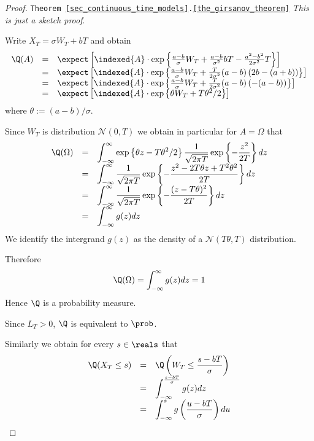\documentclass[11pt,a4paper]{article}
\begin{document}
  \begin{proof}{\texttt{Theorem \ref{sec_continuous_time_models}.\ref{the_girsanov_theorem}}}
    \textit{This is just a sketch proof}.
    \par Write $X_T=\sigma W_T+bT$ and obtain
    \[\begin{array}{rcl}
      \Q(A)&=&\expect\left[\indexed\{A\}\cdot\exp\left\{\frac{a-b}\sigma W_T+\frac{a-b}{\sigma^2}bT-\frac{a^2-b^2}{2\sigma^2}T\right\}\right]\\
      &=&\expect\left[\indexed\{A\}\cdot\exp\left\{\frac{a-b}\sigma W_T+\frac{T}{2\sigma^2}(a-b)\left(2b-(a+b)\right)\right\}\right]\\
      &=&\expect\left[\indexed\{A\}\cdot\exp\left\{\frac{a-b}\sigma W_T+\frac{T}{2\sigma^2}(a-b)\left(-(a-b)\right)\right\}\right]\\
      &=&\expect\left[\indexed\{A\}\cdot\exp\left\{\theta W_T+T\theta^2/2\right\}\right]
    \end{array}\]
    where $\theta:=(a-b)/\sigma$.
    \par Since $W_T$ is distribution $\mathcal{N}(0,T)$ we obtain in particular for $A=\Omega$ that
    \[\everymath={\displaystyle}\begin{array}{rcl}
      \Q(\Omega)&=&\int_{-\infty}^\infty\exp\left\{\theta z-T\theta^2/2\right\}\frac1{\sqrt{2\pi T}}\exp\left\{-\frac{z^2}{2T}\right\}dz\\
      &=&\int_{-\infty}^\infty\frac1{\sqrt{2\pi T}}\exp\left\{-\frac{z^2-2T\theta z+T^2\theta^2}{2T}\right\}dz\\
      &=&\int_{-\infty}^\infty\frac1{\sqrt{2\pi T}}\exp\left\{-\frac{(z-T\theta)^2}{2T}\right\}dz\\
      &=&\int_{-\infty}^\infty g(z)dz
    \end{array}\]
    We identify the intergrand $g(z)$ as the density of a $\mathcal{N}(T\theta,T)$ distribution.
    \par Therefore
    \[ \Q(\Omega)=\int_{-\infty}^\infty g(z)dz=1 \]
    Hence $\Q$ is a probability measure.
    \par Since $L_T>0$, $\Q$ is equivalent to $\prob$.
    \par Similarly we obtain for every $s\in\reals$ that
    \[\everymath={\displaystyle}\begin{array}{rcl}
      \Q(X_T\leq s)&=&\Q\left(W_T\leq \frac{s-bT}\sigma\right)\\
      &=&\int_{-\infty}^{\frac{s-bT}\sigma}g(z)dz\\
      &=&\int_{-\infty}^sg\left(\frac{u-bT}\sigma\right)du

\end{array}\]
\end{proof}
\end{document}

